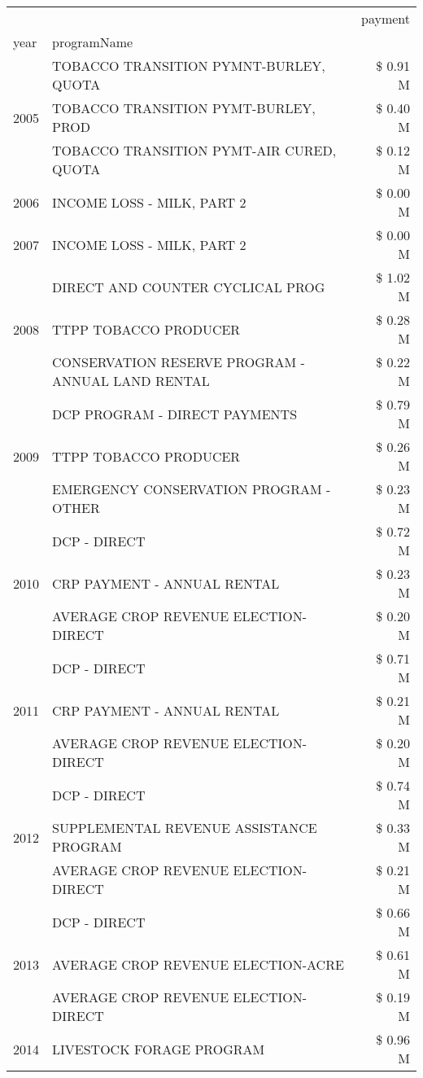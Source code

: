 \begin{tabular}{llr}
\toprule
 &  & payment \\
year & programName &  \\
\midrule
\multirow[t]{3}{*}{2005} & TOBACCO TRANSITION PYMNT-BURLEY, QUOTA & \$ 0.91 M \\
 & TOBACCO TRANSITION PYMT-BURLEY, PROD & \$ 0.40 M \\
 & TOBACCO TRANSITION PYMT-AIR CURED, QUOTA & \$ 0.12 M \\
\cline{1-3}
2006 & INCOME LOSS - MILK, PART 2 & \$ 0.00 M \\
\cline{1-3}
2007 & INCOME LOSS - MILK, PART 2 & \$ 0.00 M \\
\cline{1-3}
\multirow[t]{3}{*}{2008} & DIRECT AND COUNTER CYCLICAL PROG & \$ 1.02 M \\
 & TTPP TOBACCO PRODUCER & \$ 0.28 M \\
 & CONSERVATION RESERVE PROGRAM - ANNUAL LAND RENTAL & \$ 0.22 M \\
\cline{1-3}
\multirow[t]{3}{*}{2009} & DCP PROGRAM - DIRECT PAYMENTS & \$ 0.79 M \\
 & TTPP TOBACCO PRODUCER & \$ 0.26 M \\
 & EMERGENCY CONSERVATION PROGRAM - OTHER & \$ 0.23 M \\
\cline{1-3}
\multirow[t]{3}{*}{2010} & DCP - DIRECT & \$ 0.72 M \\
 & CRP PAYMENT - ANNUAL RENTAL & \$ 0.23 M \\
 & AVERAGE CROP REVENUE ELECTION-DIRECT & \$ 0.20 M \\
\cline{1-3}
\multirow[t]{3}{*}{2011} & DCP - DIRECT & \$ 0.71 M \\
 & CRP PAYMENT - ANNUAL RENTAL & \$ 0.21 M \\
 & AVERAGE CROP REVENUE ELECTION-DIRECT & \$ 0.20 M \\
\cline{1-3}
\multirow[t]{3}{*}{2012} & DCP - DIRECT & \$ 0.74 M \\
 & SUPPLEMENTAL REVENUE ASSISTANCE PROGRAM & \$ 0.33 M \\
 & AVERAGE CROP REVENUE ELECTION-DIRECT & \$ 0.21 M \\
\cline{1-3}
\multirow[t]{3}{*}{2013} & DCP - DIRECT & \$ 0.66 M \\
 & AVERAGE CROP REVENUE ELECTION-ACRE & \$ 0.61 M \\
 & AVERAGE CROP REVENUE ELECTION-DIRECT & \$ 0.19 M \\
\cline{1-3}
\multirow[t]{3}{*}{2014} & LIVESTOCK FORAGE PROGRAM & \$ 0.96 M \\

\end{tabular}
